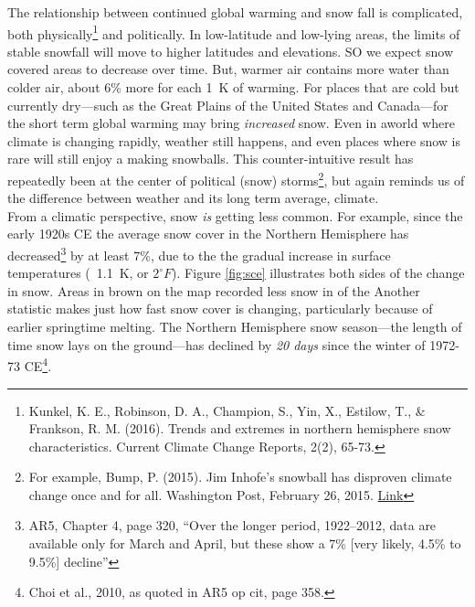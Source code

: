 \documentclass[amstex,12pt]{book}
\begin{document}
The relationship between continued global warming and snow fall is complicated, both physically\footnote{Kunkel, K. E., Robinson, D. A., Champion, S., Yin, X., Estilow, T., \& Frankson, R. M. (2016). Trends and extremes in northern hemisphere snow characteristics. Current Climate Change Reports, 2(2), 65-73.} and politically. In low-latitude and low-lying areas, the limits of stable snowfall will move to higher latitudes and elevations. SO we expect snow covered areas to decrease over time. But, warmer air contains more water than colder air, about 6\% more for each \SI{+1}{\kelvin} of warming. For places that are cold but currently dry---such as the Great Plains of the United States and Canada---for the short term global warming may bring \emph{increased} snow. Even in aworld where climate is changing rapidly, weather still happens, and even places where snow is rare will still enjoy a making snowballs. This counter-intuitive result has repeatedly been at the center of political (snow) storms\footnote{For example, Bump, P. (2015). Jim Inhofe's snowball has disproven climate change once and for all. Washington Post, February 26, 2015. \href{https://www.washingtonpost.com/news/the-fix/wp/2015/02/26/jim-inhofes-snowball-has-disproven-climate-change-once-and-for-all/?utm_term=.d10d986358c5}{Link}}, but again reminds us of the difference between weather and its long term average, climate.\\
From a climatic perspective, snow \emph{is} getting less common. For example, since the early 1920s CE the average snow cover in the Northern Hemisphere has decreased\footnote{AR5, Chapter 4, page 320, ``Over the longer period, 1922–2012, data are available only for March and April, but these show a 7\% [very likely, 4.5\% to 9.5\%] decline''} by at least 7\%, due to the the gradual increase in surface temperatures (~\SI{+1.1}{\kelvin}, or $2^{\circ}F$). Figure \ref{fig:sce} illustrates both sides of the change in snow. Areas in brown on the map recorded less snow in  of the Another statistic makes just how fast snow cover is changing, particularly because of earlier springtime melting. The Northern Hemisphere snow season---the length of time snow lays on the ground---has declined by \emph{20 days} since the winter of 1972-73 CE\footnote{Choi et al., 2010, as quoted in AR5 op cit, page 358.}.  
\end{document}
